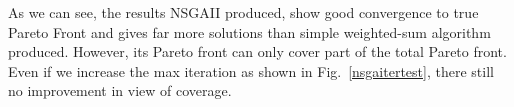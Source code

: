 \documentclass[10pt,journal,compsoc]{IEEEtran}
\newcommand{\Fig}[1]{Fig.~\ref{#1}}
\begin{document}
\begin{table}[ht]
\caption{NSGAII Parameter Selection}
\label{nsgaparatable}
\centering
{}
\end{table}

As we can see, the results NSGAII produced, show good convergence to true Pareto Front and gives far more solutions than simple weighted-sum algorithm produced. However, its Pareto front can only cover part of the total Pareto front. Even if we increase the max iteration as shown in \Fig{nsgaitertest}, there still no improvement in view of coverage. 
\end{document}
